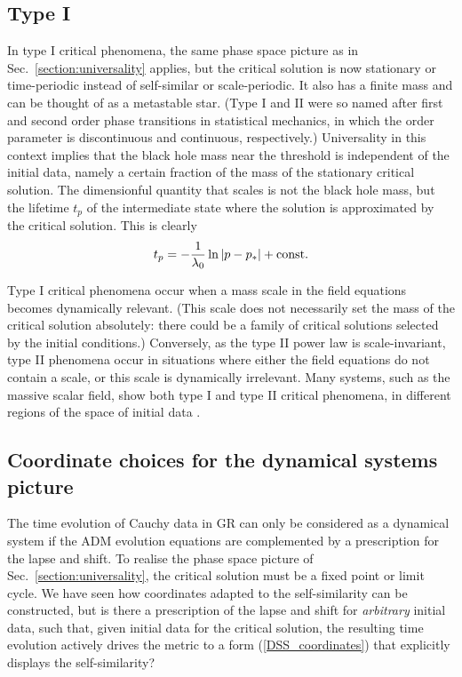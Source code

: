 \documentclass{article}
\begin{document}

\subsection{Type I}
\label{section:typeI}
 
In type I critical phenomena, the same phase space picture as in
Sec.~\ref{section:universality} applies, but the critical solution is
now stationary or time-periodic instead of self-similar or
scale-periodic. It also has a finite mass and can be thought of
as a metastable star. (Type I and II were so named after first and
second order phase transitions in statistical mechanics, in which the
order parameter is discontinuous and continuous, respectively.)
Universality in this context implies that the black hole mass near the
threshold is independent of the initial data, namely a certain
fraction of the mass of the stationary critical solution. The
dimensionful quantity that scales is not the black hole mass, but the
lifetime $t_p$ of the intermediate state where the solution is
approximated by the critical solution. This is clearly
\begin{equation}
\label{typeIscaling}
t_p = - {1\over \lambda_0} \ln|p-p_*| + {\rm const.}
\end{equation}

Type I critical phenomena occur when a mass scale in the field
equations becomes dynamically relevant. (This scale does not
necessarily set the mass of the critical solution absolutely: there
could be a family of critical solutions selected by the initial
conditions.) Conversely, as the type II power law is scale-invariant,
type II phenomena occur in situations where either the field equations
do not contain a scale, or this scale is dynamically irrelevant. Many
systems, such as the massive scalar field, show both type I and type
II critical phenomena, in different regions of the space of initial
data \cite{BradyChambersGoncalves}.


\subsection{Coordinate choices for the dynamical systems picture}
\label{section:coordinates}

The time evolution of Cauchy data in GR can only be considered as a
dynamical system if the ADM evolution equations are complemented by a
prescription for the lapse and shift. To realise the phase space
picture of Sec.~\ref{section:universality}, the critical solution
must be a fixed point or limit cycle. We have seen how coordinates
adapted to the self-similarity can be constructed, but is there a
prescription of the lapse and shift for {\em arbitrary} initial data,
such that, given initial data for the critical solution, the resulting
time evolution actively drives the metric to a form
(\ref{DSS_coordinates}) that explicitly displays the self-similarity?
\end{document}
